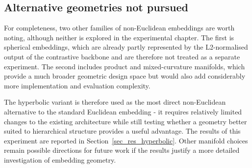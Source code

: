 \subsection{Alternative geometries not pursued}
\label{sec_lit_geometry_alternatives}

For completeness,
two other families of non-Euclidean embeddings are worth noting,
although neither is explored in the experimental chapter.
The first is spherical embeddings,
which are already partly represented by the L2-normalised output of the contrastive backbone
and are therefore not treated as a separate experiment.
The second includes product and mixed-curvature manifolds,
which provide a much broader geometric design space
but would also add considerably more implementation and evaluation complexity.

The hyperbolic variant is therefore used as the most direct non-Euclidean alternative
to the standard Euclidean embedding -
it requires relatively limited changes to the existing architecture
while still testing whether a geometry better suited to hierarchical structure provides a useful advantage.
The results of this experiment are reported in Section~\ref{sec_res_hyperbolic}.
Other manifold choices remain possible directions for future work
if the results justify a more detailed investigation of embedding geometry.
